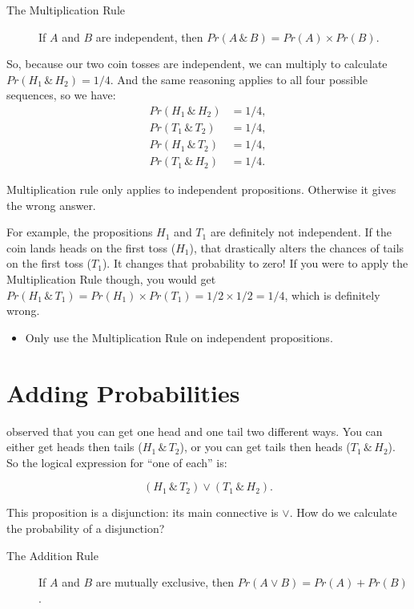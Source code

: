 \documentclass[justified]{tufte-book}
\newenvironment{warning}{\begin{itemize}\item[\faBan]}{\end{itemize}}
\theoremstyle{definition}
\theoremstyle{definition}
\theoremstyle{definition}
\theoremstyle{remark}
\begin{document}
\begin{description}
\item[The Multiplication Rule]
If \(A\) and \(B\) are independent, then
\(Pr(A \,\&\, B) = Pr(A) \times Pr(B)\).
\end{description}

So, because our two coin tosses are independent, we can multiply to
calculate \(Pr(H_1 \,\&\, H_2) = 1/4\). And the same reasoning applies
to all four possible sequences, so we have: \[
  \begin{aligned}
    Pr(H_1 \,\&\, H_2) &= 1/4,\\
    Pr(T_1 \,\&\, T_2) &= 1/4,\\
    Pr(H_1 \,\&\, T_2) &= 1/4,\\
    Pr(T_1 \,\&\, H_2) &= 1/4.
  \end{aligned}
\]

 Multiplication rule only applies to independent
propositions. Otherwise it gives the wrong answer.

For example, the propositions \(H_1\) and \(T_1\) are definitely not
independent. If the coin lands heads on the first toss (\(H_1\)), that
drastically alters the chances of tails on the first toss (\(T_1\)). It
changes that probability to zero! If you were to apply the
Multiplication Rule though, you would get
\(Pr(H_1 \,\&\, T_1) = Pr(H_1) \times Pr(T_1) = 1/2 \times 1/2 = 1/4\),
which is definitely wrong.

\begin{warning}
Only use the Multiplication Rule on independent propositions.
\end{warning}

\hypertarget{adding-probabilities}{%
\section{Adding Probabilities}\label{adding-probabilities}}

 observed that you can get one head and one tail two
different ways. You can either get heads then tails
(\(H_1 \,\&\, T_2\)), or you can get tails then heads
(\(T_1 \,\&\, H_2\)). So the logical expression for ``one of each'' is:

\[ (H_1 \,\&\, T_2) \vee (T_1 \,\&\, H_2). \]

This proposition is a disjunction: its main connective is \(\vee\). How
do we calculate the probability of a disjunction?

\begin{description}
\item[The Addition Rule]
If \(A\) and \(B\) are mutually exclusive, then
\(Pr(A \vee B) = Pr(A) + Pr(B)\).
\end{description}
\end{document}

